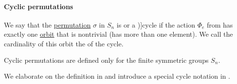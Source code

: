 \paragraph{Cyclic permutations}

\begin{definition}\label{def:cyclic_permutation}
  We say that the \hyperref[def:symmetric_group]{permutation} \( \sigma \) in \( S_n \) is  or a \term[ru=цикл (\cite[sec. 4.3]{Тыртышников2007ЛинейнаяАлгебра})]{cycle} if the action \( \Phi_e \) from  has exactly one \hyperref[def:group_action_orbit]{orbit} that is nontrivial (has more than one element). We call the cardinality of this orbit the  of the cycle.
\end{definition}
\begin{comments}
  \item Cyclic permutations are defined only for the finite symmetric groups \( S_n \).
  \item We elaborate on the definition in  and introduce a special cycle notation in .
\end{comments}

